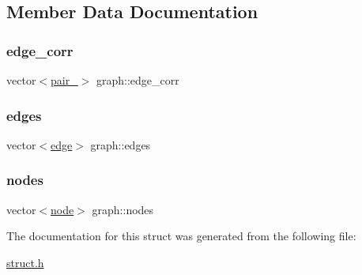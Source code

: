 \subsection{Member Data Documentation}
\mbox{\label{structgraph_abc20116f297a8a8366e95515562f1ecf}} 
\subsubsection{\texorpdfstring{edge\+\_\+corr}{edge\_corr}}
{\footnotesize\ttfamily vector$<$\hyperlink{structpair__}{pair\+\_\+}$>$ graph\+::edge\+\_\+corr}

\mbox{\label{structgraph_a3832d0d179ca14c98114098695084b79}} 
\subsubsection{\texorpdfstring{edges}{edges}}
{\footnotesize\ttfamily vector$<$\hyperlink{structedge}{edge}$>$ graph\+::edges}

\mbox{\label{structgraph_a3f0cd3084820df42d55295028391b7f9}} 
\subsubsection{\texorpdfstring{nodes}{nodes}}
{\footnotesize\ttfamily vector$<$\hyperlink{structnode}{node}$>$ graph\+::nodes}



The documentation for this struct was generated from the following file\+:\begin{DoxyCompactItemize}
\item 
\hyperlink{struct_8h}{struct.\+h}\end{DoxyCompactItemize}
